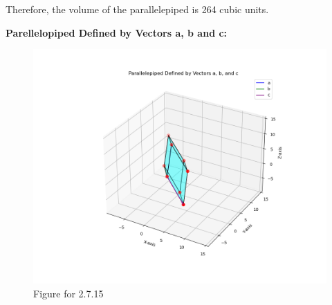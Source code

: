 \documentclass[journal]{IEEEtran}
\begin{document}
Therefore, the volume of the parallelepiped is 264 cubic units.

\newpage
\textbf{Parellelopiped Defined by Vectors a, b and c:}
\begin{figure}[h]
    \centering
    \includegraphics[width=1.1\columnwidth]{figs/fig1.png}
    \caption{Figure for 2.7.15}
    \label{fig1}
\end{figure}
\end{document}
